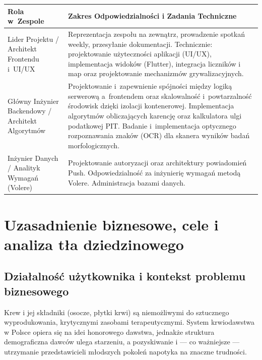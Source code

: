 \documentclass[11pt, a4paper]{article}
\begin{document}
\begin{center}
\begin{tabularx}{\linewidth}{L{3.8cm} X}
  \toprule
  \textbf{Rola w~Zespole} & \textbf{Zakres Odpowiedzialności i Zadania Techniczne} \\
  \midrule
  Lider Projektu / Architekt Frontendu i~UI/UX
    & Reprezentacja zespołu na zewnątrz, prowadzenie spotkań weekly, przesyłanie
      dokumentacji. Technicznie: projektowanie użyteczności aplikacji (UI/UX),
      implementacja widoków (Flutter), integracja liczników i map oraz projektowanie
      mechanizmów grywalizacyjnych. \\
  \addlinespace
  Główny Inżynier Backendowy / Architekt Algorytmów
    & Projektowanie i~zapewnienie spójności między logiką serwerową a~frontendem
      oraz skalowalność i~powtarzalność środowisk dzięki izolacji kontenerowej.
      Implementacja algorytmów obliczających karencję oraz kalkulatora ulgi podatkowej PIT.
      Badanie i~implementacja optycznego rozpoznawania znaków (OCR) dla skanera wyników
      badań morfologicznych. \\
  \addlinespace
  Inżynier Danych / Analityk Wymagań (Volere)
    & Projektowanie autoryzacji oraz architektury powiadomień Push.
      Odpowiedzialność za inżynierię wymagań metodą Volere.
      Administracja bazami danych. \\
  \bottomrule
\end{tabularx}
\end{center}

\section{Uzasadnienie biznesowe, cele i analiza tła dziedzinowego}

\subsection{Działalność użytkownika i kontekst problemu biznesowego}

Krew i jej składniki (osocze, płytki krwi) są niemożliwymi do sztucznego wyprodukowania,
krytycznymi zasobami terapeutycznymi. System krwiodawstwa w Polsce opiera się na idei
honorowego dawstwa, jednakże struktura demograficzna dawców ulega starzeniu, a pozyskiwanie
i — co ważniejsze — utrzymanie przedstawicieli młodszych pokoleń napotyka na znaczne
trudności.
\end{document}
